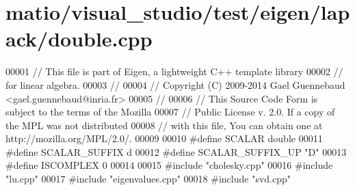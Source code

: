 \hypertarget{matio_2visual__studio_2test_2eigen_2lapack_2double_8cpp_source}{}\section{matio/visual\+\_\+studio/test/eigen/lapack/double.cpp}
\label{matio_2visual__studio_2test_2eigen_2lapack_2double_8cpp_source}

\begin{DoxyCode}
00001 \textcolor{comment}{// This file is part of Eigen, a lightweight C++ template library}
00002 \textcolor{comment}{// for linear algebra.}
00003 \textcolor{comment}{//}
00004 \textcolor{comment}{// Copyright (C) 2009-2014 Gael Guennebaud <gael.guennebaud@inria.fr>}
00005 \textcolor{comment}{//}
00006 \textcolor{comment}{// This Source Code Form is subject to the terms of the Mozilla}
00007 \textcolor{comment}{// Public License v. 2.0. If a copy of the MPL was not distributed}
00008 \textcolor{comment}{// with this file, You can obtain one at http://mozilla.org/MPL/2.0/.}
00009 
00010 \textcolor{preprocessor}{#define SCALAR        double}
00011 \textcolor{preprocessor}{#define SCALAR\_SUFFIX d}
00012 \textcolor{preprocessor}{#define SCALAR\_SUFFIX\_UP "D"}
00013 \textcolor{preprocessor}{#define ISCOMPLEX     0}
00014 
00015 \textcolor{preprocessor}{#include "cholesky.cpp"}
00016 \textcolor{preprocessor}{#include "lu.cpp"}
00017 \textcolor{preprocessor}{#include "eigenvalues.cpp"}
00018 \textcolor{preprocessor}{#include "svd.cpp"}
\end{DoxyCode}
